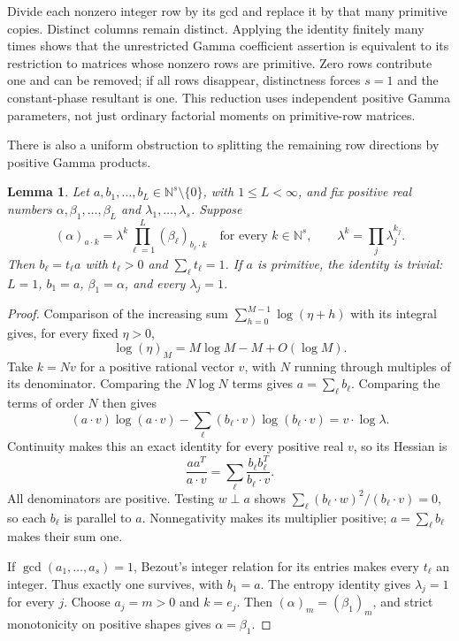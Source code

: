 \documentclass[11pt]{article}
\newtheorem{lemma}[proposition]{Lemma}
\begin{document}
Divide each nonzero integer row by its gcd and replace it by that
many primitive copies. Distinct columns remain distinct. Applying the
identity finitely many times shows that the unrestricted Gamma
coefficient assertion is equivalent to its restriction to matrices
whose nonzero rows are primitive. Zero rows contribute one and can be
removed; if all rows disappear, distinctness forces $s=1$ and the
constant-phase resultant is one. This reduction uses independent
positive Gamma parameters, not just ordinary factorial moments on
primitive-row matrices.

There is also a uniform obstruction to splitting the remaining row
directions by positive Gamma products.

\begin{lemma}\label{lem:gamma-profile-rigidity}
Let $a,b_1,\ldots,b_L\in\mathbb N^s\setminus\{0\}$, with $1\le L<\infty$,
and fix positive real numbers $\alpha,\beta_1,\ldots,\beta_L$ and
$\lambda_1,\ldots,\lambda_s$. Suppose
\[
 (\alpha)_{a\cdot k}
   =\lambda^k\prod_{\ell=1}^L(\beta_\ell)_{b_\ell\cdot k}
       \quad\text{for every }k\in\mathbb N^s,
 \qquad \lambda^k=\prod_j\lambda_j^{k_j}.
\]
Then $b_\ell=t_\ell a$ with $t_\ell>0$ and $\sum_\ell t_\ell=1$.
If $a$ is primitive, the identity is trivial:
$L=1$, $b_1=a$, $\beta_1=\alpha$, and every $\lambda_j=1$.
\end{lemma}
\begin{proof}
Comparison of the increasing sum $\sum_{h=0}^{M-1}\log(\eta+h)$
with its integral gives, for every fixed $\eta>0$,
\[
 \log(\eta)_M=M\log M-M+O(\log M).
\]
Take $k=Nv$ for a positive rational vector $v$, with $N$ running
through multiples of its denominator. Comparing the $N\log N$ terms
gives $a=\sum_\ell b_\ell$. Comparing the terms of order $N$ then gives
\[
 (a\cdot v)\log(a\cdot v)
  -\sum_\ell(b_\ell\cdot v)\log(b_\ell\cdot v)
          =v\cdot\log\lambda.
\]
Continuity makes this an exact identity for every positive real $v$,
so its Hessian is
\[
 \frac{aa^T}{a\cdot v}
       =\sum_\ell\frac{b_\ell b_\ell^T}{b_\ell\cdot v}.
\]
All denominators are positive. Testing $w\perp a$ shows
$\sum_\ell(b_\ell\cdot w)^2/(b_\ell\cdot v)=0$, so each $b_\ell$
is parallel to $a$. Nonnegativity makes its multiplier positive;
$a=\sum_\ell b_\ell$ makes their sum one.

If $\gcd(a_1,\ldots,a_s)=1$, Bezout's integer relation for its entries
makes every $t_\ell$ an integer. Thus exactly one survives, with
$b_1=a$. The entropy identity gives $\lambda_j=1$ for every $j$.
Choose $a_j=m>0$ and $k=e_j$. Then
$(\alpha)_m=(\beta_1)_m$, and strict monotonicity on positive shapes
gives $\alpha=\beta_1$.
\end{proof}
\end{document}
